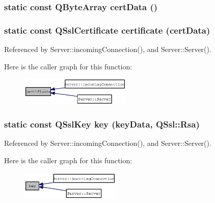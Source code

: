 \subsubsection{\setlength{\rightskip}{0pt plus 5cm}static const QByteArray certData ()\hspace{0.3cm}{\tt  [static]}}\label{server_8cpp_eb4a9d850a2e1197ebb2863c1b488f31}


\subsubsection{\setlength{\rightskip}{0pt plus 5cm}static const QSslCertificate certificate (certData)\hspace{0.3cm}{\tt  [static]}}\label{server_8cpp_fc2cd8e7e926e0609fb1a2af3a02b78c}




Referenced by Server::incomingConnection(), and Server::Server().

Here is the caller graph for this function:\nopagebreak
\begin{figure}[H]
\begin{center}
\leavevmode
\includegraphics[width=149pt]{server_8cpp_fc2cd8e7e926e0609fb1a2af3a02b78c_icgraph}
\end{center}
\end{figure}
\subsubsection{\setlength{\rightskip}{0pt plus 5cm}static const QSslKey key (keyData, QSsl::Rsa)\hspace{0.3cm}{\tt  [static]}}\label{server_8cpp_bc99944aaa79ca57ece32d48b85bc9c5}




Referenced by Server::incomingConnection(), and Server::Server().

Here is the caller graph for this function:\nopagebreak
\begin{figure}[H]
\begin{center}
\leavevmode
\includegraphics[width=134pt]{server_8cpp_bc99944aaa79ca57ece32d48b85bc9c5_icgraph}
\end{center}
\end{figure}
